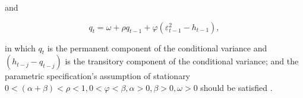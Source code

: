 and

\begin{equation}
q_{t} = \omega + \rho q_{t-1} +\varphi(\varepsilon_{t-1}^{2}-h_{t-1}),
\end{equation}

in which $q_{t}$ is the permanent component of the conditional variance and $(h_{t-j} - q_{t-j})$ is the transitory component of the conditional variance; and the parametric specification's assumption of stationary $0<(\alpha + \beta) < \rho <1, 0<\varphi<\beta, \alpha >0, \beta>0, \omega >0 $ should be satisfied \citep{0-19-829683-5,Ghalanos2014}.


%
%
% 
%
